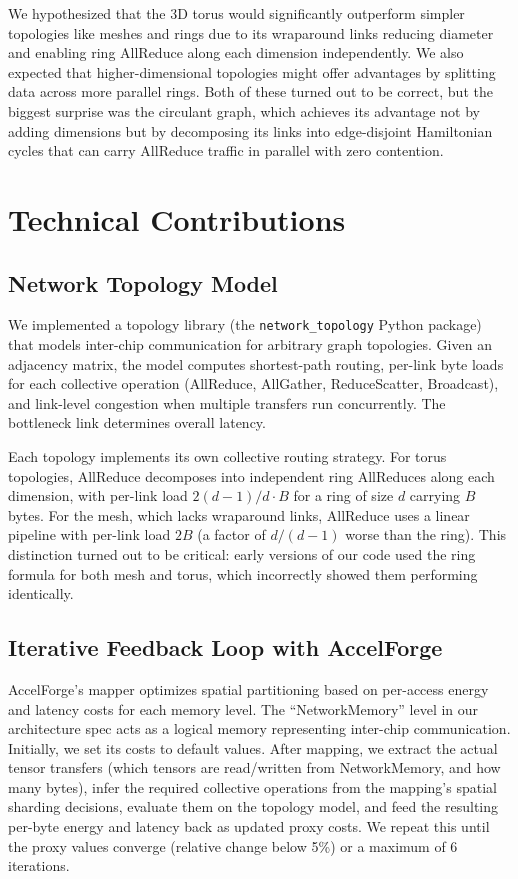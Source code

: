 \documentclass[conference,onecolumn]{IEEEtran}
\begin{document}
We hypothesized that the 3D torus would significantly outperform simpler topologies like meshes and rings due to its wraparound links reducing diameter and enabling ring AllReduce along each dimension independently. We also expected that higher-dimensional topologies might offer advantages by splitting data across more parallel rings. Both of these turned out to be correct, but the biggest surprise was the circulant graph, which achieves its advantage not by adding dimensions but by decomposing its links into edge-disjoint Hamiltonian cycles that can carry AllReduce traffic in parallel with zero contention.


\section{Technical Contributions}

\subsection{Network Topology Model}

We implemented a topology library (the \texttt{network\_topology} Python package) that models inter-chip communication for arbitrary graph topologies. Given an adjacency matrix, the model computes shortest-path routing, per-link byte loads for each collective operation (AllReduce, AllGather, ReduceScatter, Broadcast), and link-level congestion when multiple transfers run concurrently. The bottleneck link determines overall latency.

Each topology implements its own collective routing strategy. For torus topologies, AllReduce decomposes into independent ring AllReduces along each dimension, with per-link load $2(d-1)/d \cdot B$ for a ring of size $d$ carrying $B$ bytes. For the mesh, which lacks wraparound links, AllReduce uses a linear pipeline with per-link load $2B$ (a factor of $d/(d-1)$ worse than the ring). This distinction turned out to be critical: early versions of our code used the ring formula for both mesh and torus, which incorrectly showed them performing identically.

\subsection{Iterative Feedback Loop with AccelForge}

AccelForge's mapper optimizes spatial partitioning based on per-access energy and latency costs for each memory level. The ``NetworkMemory'' level in our architecture spec acts as a logical memory representing inter-chip communication. Initially, we set its costs to default values. After mapping, we extract the actual tensor transfers (which tensors are read/written from NetworkMemory, and how many bytes), infer the required collective operations from the mapping's spatial sharding decisions, evaluate them on the topology model, and feed the resulting per-byte energy and latency back as updated proxy costs. We repeat this until the proxy values converge (relative change below 5\%) or a maximum of 6 iterations.
\end{document}

